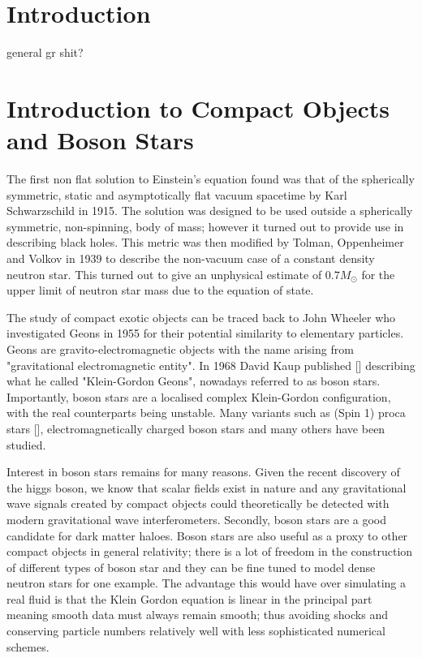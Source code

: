 


\section{Introduction}
general gr shit?

\section{Introduction to Compact Objects and Boson Stars}
The first non flat solution to Einstein's equation found was that of the spherically symmetric, static and asymptotically flat vacuum spacetime by Karl Schwarzschild in 1915. The solution was designed to be used outside a spherically symmetric, non-spinning, body of mass; however it turned out to provide use in describing black holes. This metric was then modified by Tolman, Oppenheimer and Volkov in 1939 to describe the non-vacuum case of a constant density neutron star. This turned out to give an unphysical estimate of $0.7 M_\odot$ for the upper limit of neutron star mass due to the equation of state. 

The study of compact exotic objects can be traced back to John Wheeler who investigated Geons in 1955 for their potential similarity to elementary particles. Geons are gravito-electromagnetic objects with the name arising from "gravitational electromagnetic entity". In 1968 David Kaup published [] describing what he called "Klein-Gordon Geons", nowadays referred to as boson stars. Importantly, boson stars are a localised complex Klein-Gordon configuration, with the real counterparts being unstable. Many variants such as (Spin 1) proca stars [], electromagnetically charged boson stars and many others have been studied. 

Interest in boson stars remains for many reasons. Given the recent discovery of the higgs boson, we know that scalar fields exist in nature and any gravitational wave signals created by compact objects could theoretically be detected with modern gravitational wave interferometers. Secondly, boson stars are a good candidate for dark matter haloes. Boson stars are also useful as a proxy to other compact objects in general relativity; there is a lot of freedom in the construction of different types of boson star and they can be fine tuned to model dense neutron stars for one example. The advantage this would have over simulating a real fluid is that the Klein Gordon equation is linear in the principal part meaning smooth data must always remain smooth; thus avoiding shocks and conserving particle numbers relatively well with less sophisticated numerical schemes. 

